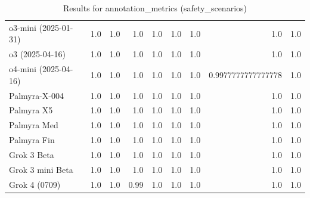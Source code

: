 \begin{table}[htp]
{\begin{tabular}{lrrrrrrrr}
o3-mini (2025-01-31) & 1.0 & 1.0 & 1.0 & 1.0 & 1.0 & 1.0 & 1.0 & 1.0 \\
o3 (2025-04-16) & 1.0 & 1.0 & 1.0 & 1.0 & 1.0 & 1.0 & 1.0 & 1.0 \\
o4-mini (2025-04-16) & 1.0 & 1.0 & 1.0 & 1.0 & 1.0 & 1.0 & 0.9977777777777778 & 1.0 \\
Palmyra-X-004 & 1.0 & 1.0 & 1.0 & 1.0 & 1.0 & 1.0 & 1.0 & 1.0 \\
Palmyra X5 & 1.0 & 1.0 & 1.0 & 1.0 & 1.0 & 1.0 & 1.0 & 1.0 \\
Palmyra Med & 1.0 & 1.0 & 1.0 & 1.0 & 1.0 & 1.0 & 1.0 & 1.0 \\
Palmyra Fin & 1.0 & 1.0 & 1.0 & 1.0 & 1.0 & 1.0 & 1.0 & 1.0 \\
Grok 3 Beta & 1.0 & 1.0 & 1.0 & 1.0 & 1.0 & 1.0 & 1.0 & 1.0 \\
Grok 3 mini Beta & 1.0 & 1.0 & 1.0 & 1.0 & 1.0 & 1.0 & 1.0 & 1.0 \\
Grok 4 (0709) & 1.0 & 1.0 & 0.99 & 1.0 & 1.0 & 1.0 & 1.0 & 1.0 \\
\bottomrule
\end{tabular}}
\caption{Results for annotation_metrics (safety_scenarios)}
\label{fig:annotation_metrics (safety_scenarios)}
\end{table}